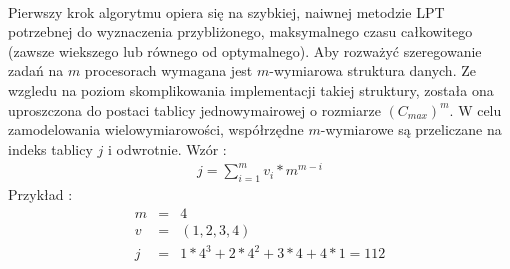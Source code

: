 \documentclass[wide,a4paper,titlepage,12pt] {article}
\begin{document}
\paragraph{}
  Pierwszy krok algorytmu opiera się na szybkiej, naiwnej metodzie LPT potrzebnej do wyznaczenia przybliżonego, maksymalnego czasu całkowitego (zawsze wiekszego lub równego od optymalnego). Aby rozważyć szeregowanie zadań na $m$ procesorach wymagana jest $m$-wymiarowa struktura danych. Ze wzgledu na poziom skomplikowania implementacji takiej struktury, została ona uproszczona do postaci tablicy jednowymairowej o rozmiarze $(C_{max})^{m}$. W celu zamodelowania wielowymiarowości, współrzędne $m$-wymiarowe są przeliczane na indeks tablicy $j$ i odwrotnie.
  \newline\newline\indent Wzór : 
  \begin{eqnarray*}
    j = \sum_{i=1}^{m} v_i * m^{m-i}
  \end{eqnarray*}
    \newline\newline\indent Przykład : 
  \begin{eqnarray*}
    m &=& 4 \\ v &=& (1,2,3,4) \\
    j &=& 1 * 4^3 + 2 * 4^2 + 3 * 4 + 4 * 1 = 112 
  \end{eqnarray*}
\end{document}

